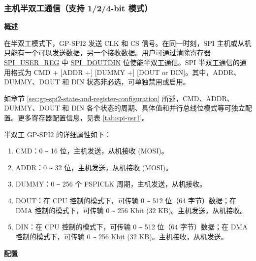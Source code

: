 \documentclass[main\_\_CN.tex]{subfiles}
\begin{document}
\subsubsection{主机半双工通信（支持 1/2/4-bit 模式）}
\label{sec:gp-spi2-1/2/8-bits}

\textbf{概述}

在半双工模式下，GP-SPI2 发送 CLK 和 CS 信号。在同一时刻，SPI 主机或从机只能有一个可以发送数据，另一个接收数据。用户可通过清除寄存器 \hyperref[regdesc:SPIUSERREG]{SPI\_USER\_REG} 中 \hyperref[fielddesc:SPIDOUTDIN]{SPI\_DOUTDIN} 位使能半双工通信。SPI 半双工通信的通用格式为 CMD + [ADDR +] [DUMMY +] [DOUT or DIN]。其中，ADDR、DUMMY、DOUT 和 DIN 状态非必选，可单独禁用或启用。

如章节  \ref{sec:gp-spi2-state-and-register-configuration} 所述，CMD、ADDR、DUMMY、DOUT 和 DIN 各个状态的周期、具体值和并行总线位模式等可独立配置。更多寄存器配置信息，见表  \ref{tab:spi-usr1}。

半双工 GP-SPI2 的详细属性如下：

\begin{enumerate}
    \item CMD：0 \verb+~+ 16 位，主机发送，从机接收 (MOSI)。
    \item ADDR：0 \verb+~+ 32 位，主机发送，从机接收 (MOSI)。
    \item DUMMY：0 \verb+~+ 256 个 FSPICLK 周期，主机发送，从机接收。
    \item DOUT：在 CPU 控制的模式下，可传输 0 \verb+~+ 512 位（64 字节）数据；在 DMA 控制的模式下，可传输 0 \verb+~+ 256 Kbit (32 KB)。主机发送，从机接收。

    \item DIN：在 CPU 控制的模式下，可传输 0 \verb+~+ 512 位（64 字节）数据；在 DMA 控制的模式下，可传输 0 \verb+~+ 256 Kbit (32 KB)。主机接收，从机发送。
\end{enumerate}

\textbf{配置}
\end{document}
